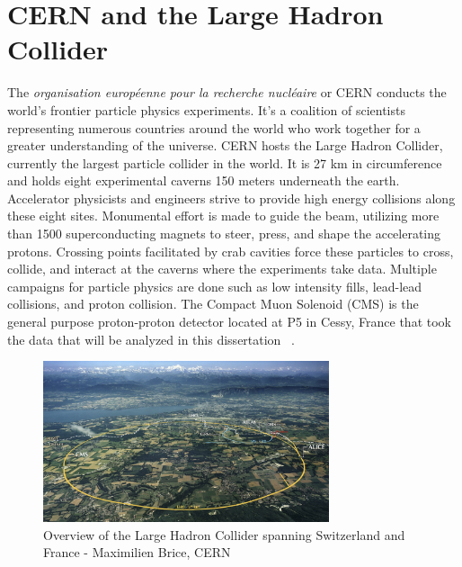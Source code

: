 \section{CERN and the Large Hadron Collider}
The \textit{organisation européenne pour la recherche nucléaire} or CERN conducts the world's frontier particle physics experiments. It's a coalition of scientists representing numerous countries around the world who work together for a greater understanding of the universe. CERN hosts the Large Hadron Collider, currently the largest particle collider in the world. It is 27 km in circumference and holds eight experimental caverns 150 meters underneath the earth. Accelerator physicists and engineers strive to provide high energy collisions along these eight sites. Monumental effort is made to guide the beam, utilizing more than 1500 superconducting magnets to steer, press, and shape the accelerating protons. Crossing points facilitated by crab cavities force these particles to cross, collide, and interact at the caverns where the experiments take data. Multiple campaigns for particle physics are done such as low intensity fills, lead-lead collisions, and proton collision. The Compact Muon Solenoid (CMS) is the general purpose proton-proton detector located at P5 in Cessy, France that took the data that will be analyzed in this dissertation ~\cite{Bruning:782076}. 

\begin{figure}[ht!b]
  \centering
\includegraphics[width=0.75\textwidth]{figures/LHC_map-s.jpg}    
    \caption{\label{fig:lhc} Overview of the Large Hadron Collider spanning Switzerland and France - Maximilien Brice, CERN }
\end{figure}

